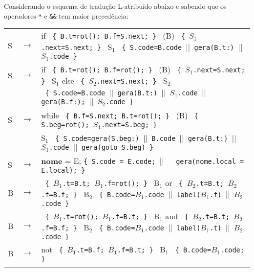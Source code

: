 \documentclass[11pt,portuguese,a4paper]{article}
\newcommand{\et}[1]{\texttt{#1}}
\begin{document}

Considerando o esquema de tradução L-atribuído abaixo e sabendo que os operadores \texttt{*} e \texttt{\&\&} tem maior precedência:

\medskip

\begin{tabularx}{\textwidth}{llX}
 S  &  $\rightarrow$  &  if  \et{ \{ B.t=rot(); B.f=S.next; \} }  (B) \et{ \{ $S_1$.next=S.next; \} }  S$_1$ \et{ \{ S.code=B.code    $\vert\vert$ gera(B.t:) $\vert\vert$ $S_1$.code  \} }  \\\medskip

 S  &  $\rightarrow$  &  if  \et{ \{ B.t=rot(); B.f=rot(); \} }  (B)   \et{ \{ $S_1$.next=S.next; \} }  S$_1$ else \et{ \{     $S_2$.next=S.next; \} }   S$_2$ \\
    &                 & \et{ \{ S.code=B.code $\vert\vert$    gera(B.t:) $\vert\vert$ $S_1$.code $\vert\vert$  gera(B.f:);    $\vert\vert$ $S_2$.code \} }  \\\medskip

 
 S  &  $\rightarrow$  &  while \et{ \{ B.f=S.next; B.t=rot(); \} }  (B) \et{ \{ S.beg=rot(); $S_1$.next=S.beg; \} }                                              \\\medskip
    &                 &  S$_1$ \et{ \{ S.code=gera(S.beg:) $\vert\vert$ B.code $\vert\vert$  gera(B.t:) $\vert\vert$ $S_1$.code $\vert\vert$ gera(goto S.beg)  \} }           \\\medskip



 S  &  $\rightarrow$  &  \textbf{nome} = E;    \texttt{\small \{ S.code = E.code; $\vert\vert$  \ \  gera(nome.local = E.local); \} }                                 \\\medskip



 B  &  $\rightarrow$  &  \et{ \{ $B_1$.t=B.t; $B_1$.f=rot(); \} } B$_1$ or \et{ \{ $B_2$.t=B.t; $B_2$.f=B.f; \} } B$_2$   \et{ \{ B.code=$B_1$.code $\vert\vert$\ label($B_1$.f) $\vert\vert$\ $B_2$.code \} }                 \\\medskip


 B  &  $\rightarrow$  &  \et{ \{ $B_1$.t=rot(); $B_1$.f=B.f; \} } B$_1$ and \et{ \{ $B_2$.t=B.t; $B_2$.f=B.f; \} } B$_2$  \et{ \{ B.code=$B_1$.code $\vert\vert$\ label($B_1$.t) $\vert\vert$\ $B_2$.code \} }                 \\\medskip


 B  &  $\rightarrow$  &  not \et{ \{ $B_1$.t=B.f; $B_1$.f=B.t; \} } B$_1$ \et{ \{ B.code=$B_1$.code; \} }                 \\\medskip



\end{tabularx}
\end{document}
